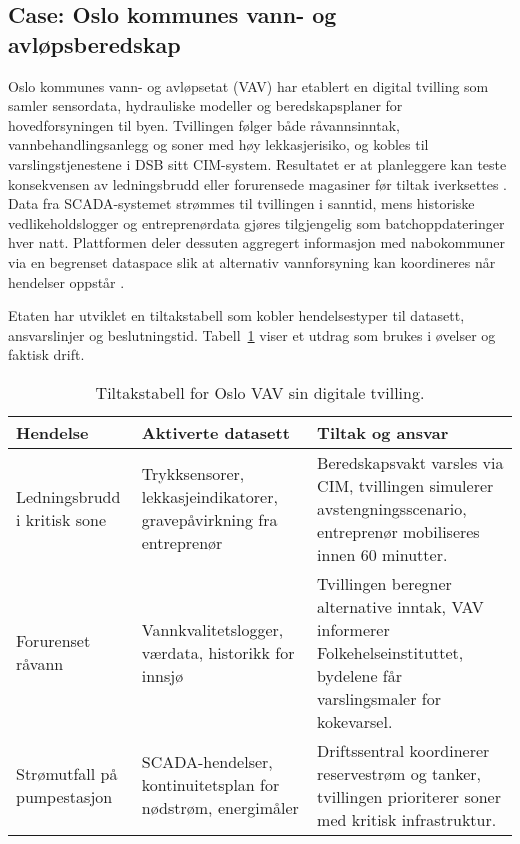 \subsection{Case: Oslo kommunes vann- og avløpsberedskap}
Oslo kommunes vann- og avløpsetat (VAV) har etablert en digital tvilling som samler sensordata, hydrauliske modeller og
beredskapsplaner for hovedforsyningen til byen. Tvillingen følger både råvannsinntak, vannbehandlingsanlegg og soner med høy
lekkasjerisiko, og kobles til varslingstjenestene i DSB sitt CIM-system. Resultatet er at planleggere kan teste konsekvensen av
ledningsbrudd eller forurensede magasiner før tiltak iverksettes \citep{oslovav2023digital}. Data fra SCADA-systemet strømmes til
tvillingen i sanntid, mens historiske vedlikeholdslogger og entreprenørdata gjøres tilgjengelig som batchoppdateringer hver
natt. Plattformen deler dessuten aggregert informasjon med nabokommuner via en begrenset dataspace slik at alternativ
vannforsyning kan koordineres når hendelser oppstår \citep{norskvann2023digitaltvilling}.

Etaten har utviklet en tiltakstabell som kobler hendelsestyper til datasett, ansvarslinjer og beslutningstid. Tabell~\ref{tab:kap03-oslo-vav}
viser et utdrag som brukes i øvelser og faktisk drift.

\begin{table}[ht]
    \centering
    \caption{Tiltakstabell for Oslo VAV sin digitale tvilling.}
    \label{tab:kap03-oslo-vav}
    \begin{tabular}{p{}p{}p{}}
        \toprule
        \textbf{Hendelse} & \textbf{Aktiverte datasett} & \textbf{Tiltak og ansvar} \\
        \midrule
        Ledningsbrudd i kritisk sone & Trykksensorer, lekkasjeindikatorer, gravepåvirkning fra entreprenør & Beredskapsvakt varsles via CIM, tvillingen simulerer avstengningsscenario, entreprenør mobiliseres innen 60 minutter. \\
        Forurenset råvann & Vannkvalitetslogger, værdata, historikk for innsjø & Tvillingen beregner alternative inntak, VAV informerer Folkehelseinstituttet, bydelene får varslingsmaler for kokevarsel. \\
        Strømutfall på pumpestasjon & SCADA-hendelser, kontinuitetsplan for nødstrøm, energimåler & Driftssentral koordinerer reservestrøm og tanker, tvillingen prioriterer soner med kritisk infrastruktur. \\
        \bottomrule
    \end{tabular}
\end{table}

